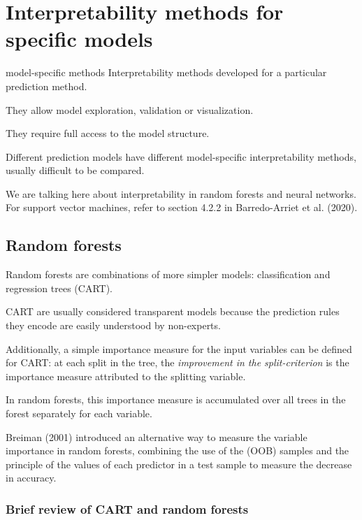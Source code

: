 \chapter{Interpretability methods for specific models}

\begin{definition}{model-specific methods}{}
    Interpretability methods developed for a particular prediction method.

    They allow model exploration, validation or visualization.

    They require full access to the model structure.

    Different prediction models have different model-specific interpretability
    methods, usually difficult to be compared.

    \tcblower

    We are talking here about interpretability in random forests and neural
    networks. For support vector machines, refer to section 4.2.2 in
    Barredo-Arriet et al. (2020).
\end{definition}

\section{Random forests}

Random forests are combinations of more simpler models:
classification and regression trees (CART).

CART are usually considered transparent models because the
prediction rules they encode are easily understood by non-experts.

Additionally, a simple importance measure for the input variables
can be defined for CART: at each split in the tree, the
\emph{improvement in the split-criterion} is the importance measure
attributed to the splitting variable.

In random forests, this importance measure is accumulated over all trees in the forest
separately for each variable.

Breiman (2001) introduced an alternative way to measure the variable importance
in random forests, combining the use of the
 (OOB) samples and the principle of
 the values of each predictor in a test sample to
measure the decrease in accuracy.

\subsection{Brief review of CART and random forests}

